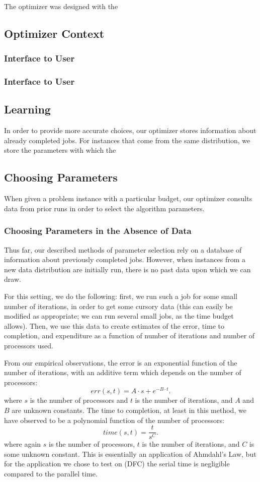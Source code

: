 
The optimizer was designed with the 
\subsection{Optimizer Context}
\subsubsection{Interface to User}
\subsubsection{Interface to User}

\subsection{Learning}

In order to provide more accurate choices, our optimizer stores information
about already completed jobs. For instances that come from the same distribution, we store the parameters with which the 


\subsection{Choosing Parameters}

When given a problem instance with a particular budget, our optimizer
consults data from prior runs in order to select the algorithm 
parameters. 

\subsubsection{Choosing Parameters in the Absence of Data}

Thus far, our described methods of parameter selection rely on a database
of information about previously completed jobs. However, when instances
from a new data distribution are initially run, there is no past data upon
which we can draw.

For this setting, we do the following: first, we run such a job for some
small number of iterations, in order to get some cursory data (this can
easily be modified as appropriate; we can run several small jobs, as the 
time budget allows). Then, we use this data to create estimates of the 
error, time to completion, and expenditure as a function of number of 
iterations and number of processors used.

From our empirical observations, the error is an exponential function of
the number of iterations, with an additive term which depends on the number
of processors:
\[
err(s,t) = A\cdot s + e^{-B\cdot t}.
\]
where $s$ is the number of processors and $t$ is the number of iterations, 
and $A$ and $B$ are unknown constants. The time to completion, at least 
in this method, we have observed to be a polynomial function of the 
number of processors:
\[
time(s,t) = \frac{t}{s^{C}}.
\]
where again $s$ is the number of processors, $t$ is the number of iterations, and $C$ is some unknown constant. This is essentially an application of 
Ahmdahl's Law, but for the application we chose to test on (DFC) the
serial time is negligible compared to the parallel time.

